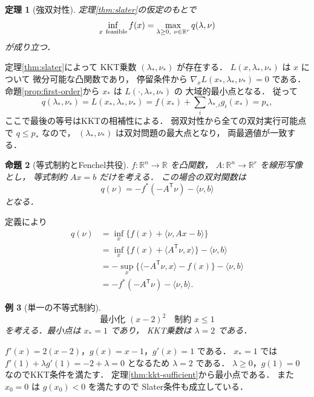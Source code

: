 \documentclass[a5paper,10pt,onecolumn]{jsarticle}
\makeatletter
\theoremstyle{mathnotetheorem}
\newtheorem{theorem}{定理}[section]
\newtheorem{proposition}[theorem]{命題}
\newtheorem{example}[theorem]{例}
\renewcommand{\proofname}{証明}
\renewenvironment{proof}[1][\proofname]{%
  \par\pushQED{\qed}\normalfont\topsep4\p@\@plus2\p@\relax
  \trivlist\item[\hskip\labelsep\bfseries #1]\ignorespaces
}{\popQED\endtrivlist\@endpefalse}
\makeatother
\begin{document}
\begin{theorem}[強双対性]\label{thm:strong-duality}
定理\ref{thm:slater}の仮定のもとで
\[
 \inf_{x\ {\rm feasible}}f(x)
 =\max_{\lambda\ge0,\ \nu\in\mathbb R^r}
 q(\lambda,\nu)
\]
が成り立つ．
\end{theorem}
\begin{proof}
定理\ref{thm:slater}によって
KKT乗数 $(\lambda_*,\nu_*)$ が存在する．
$L(x,\lambda_*,\nu_*)$ は $x$ について
微分可能な凸関数であり，
停留条件から
$\nabla_x L(x_*,\lambda_*,\nu_*)=0$
である．
命題\ref{prop:first-order}から
$x_*$ は $L(\cdot,\lambda_*,\nu_*)$ の
大域的最小点となる．
従って
\[
 q(\lambda_*,\nu_*)
 =L(x_*,\lambda_*,\nu_*)
 =f(x_*)+\sum_i\lambda_{*,i}g_i(x_*)
 =p_*,
\]
ここで最後の等号はKKTの相補性による．
弱双対性から全ての双対実行可能点で $q\le p_*$ なので，
$(\lambda_*,\nu_*)$ は双対問題の最大点となり，
両最適値が一致する．
\end{proof}

\begin{proposition}[等式制約とFenchel共役]\label{prop:fenchel}
$f:\mathbb R^n\to\mathbb R$ を凸関数，
$A:\mathbb R^n\to\mathbb R^r$ を線形写像とし，
等式制約 $Ax=b$ だけを考える．
この場合の双対関数は
\[
 q(\nu)=-f^*(-A^{\mathsf T}\nu)-\langle\nu,b\rangle
\]
となる．
\end{proposition}
\begin{proof}
定義により
\begin{align*}
 q(\nu)
 &=\inf_x\{f(x)+\langle\nu,Ax-b\rangle\}\\
 &=\inf_x\{f(x)+\langle A^{\mathsf T}\nu,x\rangle\}
   -\langle\nu,b\rangle\\
 &=-\sup_x\{\langle-A^{\mathsf T}\nu,x\rangle-f(x)\}
   -\langle\nu,b\rangle\\
 &=-f^*(-A^{\mathsf T}\nu)-\langle\nu,b\rangle.
\end{align*}
\end{proof}

\begin{example}[単一の不等式制約]
\[
 \text{最小化 }(x-2)^2\quad\text{制約 }x\le1
\]
を考える．最小点は $x_*=1$ であり，
KKT乗数は $\lambda=2$ である．
\end{example}
\begin{proof}
$f'(x)=2(x-2)$，$g(x)=x-1$，$g'(x)=1$ である．
$x_*=1$ では
$f'(1)+\lambda g'(1)=-2+\lambda=0$
となるため $\lambda=2$ である．
$\lambda\ge0$，$g(1)=0$ なのでKKT条件を満たす．
定理\ref{thm:kkt-sufficient}から最小点である．
また $x_0=0$ は $g(x_0)<0$ を満たすので
Slater条件も成立している．
\end{proof}
\end{document}
